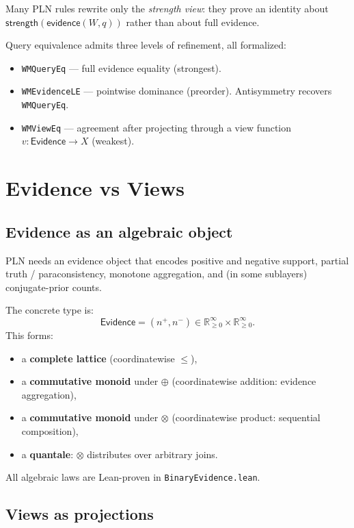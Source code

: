 \documentclass[]{article}
\newcommand{\code}[1]{\texttt{#1}}
\newcommand{\Evidence}{\mathsf{Evidence}}
\newcommand{\Strength}{\mathsf{strength}}
\newcommand{\ev}{\mathsf{evidence}}
\begin{document}
Many PLN rules rewrite only the \emph{strength view}: they prove an
identity about $\Strength(\ev(W,q))$ rather than about full evidence.

Query equivalence admits three levels of refinement, all formalized:
\begin{itemize}[leftmargin=2em]
\item \code{WMQueryEq} --- full evidence equality (strongest).
\item \code{WMEvidenceLE} --- pointwise dominance (preorder).
  Antisymmetry recovers \code{WMQueryEq}.
\item \code{WMViewEq} --- agreement after projecting through a view
  function $v : \Evidence \to X$ (weakest).
\end{itemize}


\section{Evidence vs Views}
\label{sec:evidence}

\subsection{Evidence as an algebraic object}

PLN needs an evidence object that encodes positive and negative support,
partial truth / paraconsistency, monotone aggregation, and (in some
sublayers) conjugate-prior counts.

The concrete type is:
\[
  \Evidence = (n^+, n^-) \in \mathbb{R}_{\ge 0}^\infty \times
  \mathbb{R}_{\ge 0}^\infty.
\]
This forms:
\begin{itemize}[leftmargin=2em]
\item a \textbf{complete lattice} (coordinatewise $\le$),
\item a \textbf{commutative monoid} under $\oplus$ (coordinatewise
  addition: evidence aggregation),
\item a \textbf{commutative monoid} under $\otimes$ (coordinatewise
  product: sequential composition),
\item a \textbf{quantale}: $\otimes$ distributes over arbitrary joins.
\end{itemize}

All algebraic laws are Lean-proven in \code{BinaryEvidence.lean}.


\subsection{Views as projections}
\end{document}
